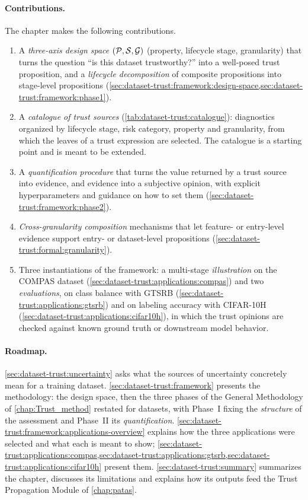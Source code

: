 \paragraph{Contributions.}
The chapter makes the following contributions.
\begin{enumerate}
  \item A \emph{three-axis design space} $(\mathcal{P}, \mathcal{S}, \mathcal{G})$ (property, lifecycle stage, granularity) that turns the question ``is this dataset trustworthy?'' into a well-posed trust proposition, and a \emph{lifecycle decomposition} of composite propositions into stage-level propositions (\cref{sec:dataset-trust:framework:design-space,sec:dataset-trust:framework:phase1}).
  \item A \emph{catalogue of trust sources} (\cref{tab:dataset-trust:catalogue}): diagnostics organized by lifecycle stage, risk category, property and granularity, from which the leaves of a trust expression are selected. The catalogue is a starting point and is meant to be extended.
  \item A \emph{quantification procedure} that turns the value returned by a trust source into evidence, and evidence into a subjective opinion, with explicit hyperparameters and guidance on how to set them (\cref{sec:dataset-trust:framework:phase2}).
  \item \emph{Cross-granularity composition} mechanisms that let feature- or entry-level evidence support entry- or dataset-level propositions (\cref{sec:dataset-trust:formal:granularity}).
  \item Three instantiations of the framework: a multi-stage \emph{illustration} on the \acs{COMPAS} dataset (\cref{sec:dataset-trust:applications:compas}) and two \emph{evaluations}, on class balance with \ac{GTSRB} (\cref{sec:dataset-trust:applications:gtsrb}) and on labeling accuracy with CIFAR-10H (\cref{sec:dataset-trust:applications:cifar10h}), in which the trust opinions are checked against known ground truth or downstream model behavior.
\end{enumerate}

\paragraph{Roadmap.}
\cref{sec:dataset-trust:uncertainty} asks what the sources of uncertainty concretely mean for a training dataset. \cref{sec:dataset-trust:framework} presents the methodology: the design space, then the three phases of the General Methodology of \cref{chap:Trust_method} restated for datasets, with Phase~I fixing the \emph{structure} of the assessment and Phase~II its \emph{quantification}. \cref{sec:dataset-trust:framework:applications-overview} explains how the three applications were selected and what each is meant to show; \cref{sec:dataset-trust:applications:compas,sec:dataset-trust:applications:gtsrb,sec:dataset-trust:applications:cifar10h} present them. \cref{sec:dataset-trust:summary} summarizes the chapter, discusses its limitations and explains how its outputs feed the Trust Propagation Module of \cref{chap:patas}.

